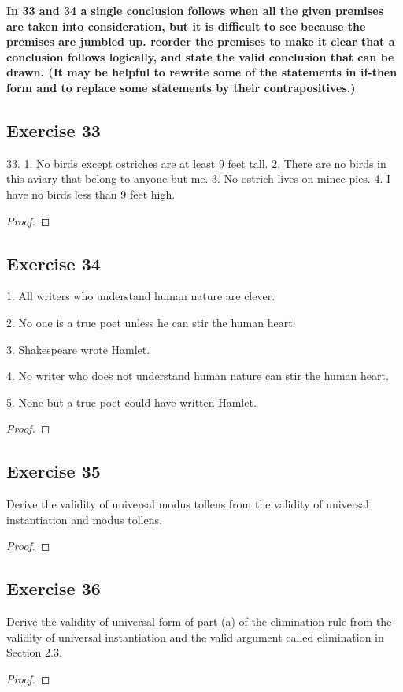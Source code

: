 \documentclass[14pt]{extarticle}
\begin{document}
{\bf \color{cyan} In 33 and 34 a single conclusion follows when all the given premises are taken into consideration, but it is difficult to see because the premises are jumbled up. reorder the premises to make it clear that a conclusion follows logically, and state the valid conclusion that can be drawn.
(It may be helpful to rewrite some of the statements in if-then form and to replace some statements by their contrapositives.)}

\subsection{Exercise 33}
33. 1. No birds except ostriches are at least 9 feet tall.
2. There are no birds in this aviary that belong to
anyone but me.
3. No ostrich lives on mince pies.
4. I have no birds less than 9 feet high.

\begin{proof}

\end{proof}

\subsection{Exercise 34}
1. All writers who understand human nature are clever.

2. No one is a true poet unless he can stir the human heart.

3. Shakespeare wrote Hamlet.

4. No writer who does not understand human nature can stir the human heart.

5. None but a true poet could have written Hamlet.

\begin{proof}

\end{proof}

\subsection{Exercise 35}
Derive the validity of universal modus tollens from the validity of universal instantiation and modus tollens.

\begin{proof}

\end{proof}

\subsection{Exercise 36}
Derive the validity of universal form of part (a) of the elimination rule from the validity of universal instantiation and the valid argument called elimination in Section 2.3.

\begin{proof}

\end{proof}
\end{document}
